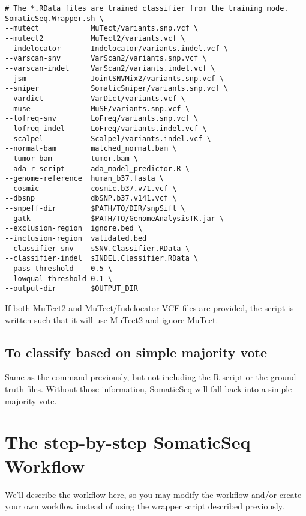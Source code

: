 \documentclass[10pt,letterpaper]{article}
\begin{document}
\begin{sloppypar}
\begin{lstlisting}
# The *.RData files are trained classifier from the training mode.
SomaticSeq.Wrapper.sh \
--mutect            MuTect/variants.snp.vcf \
--mutect2           MuTect2/variants.vcf \
--indelocator       Indelocator/variants.indel.vcf \
--varscan-snv       VarScan2/variants.snp.vcf \
--varscan-indel     VarScan2/variants.indel.vcf \
--jsm               JointSNVMix2/variants.snp.vcf \
--sniper            SomaticSniper/variants.snp.vcf \
--vardict           VarDict/variants.vcf \
--muse              MuSE/variants.snp.vcf \
--lofreq-snv        LoFreq/variants.snp.vcf \
--lofreq-indel      LoFreq/variants.indel.vcf \
--scalpel           Scalpel/variants.indel.vcf \
--normal-bam        matched_normal.bam \
--tumor-bam         tumor.bam \
--ada-r-script      ada_model_predictor.R \
--genome-reference  human_b37.fasta \
--cosmic            cosmic.b37.v71.vcf \
--dbsnp             dbSNP.b37.v141.vcf \
--snpeff-dir        $PATH/TO/DIR/snpSift \
--gatk              $PATH/TO/GenomeAnalysisTK.jar \
--exclusion-region  ignore.bed \
--inclusion-region  validated.bed
--classifier-snv    sSNV.Classifier.RData \
--classifier-indel  sINDEL.Classifier.RData \
--pass-threshold    0.5 \
--lowqual-threshold 0.1 \
--output-dir        $OUTPUT_DIR

\end{lstlisting}

If both MuTect2 and MuTect/Indelocator VCF files are provided, the script is written such that it will use MuTect2 and ignore MuTect.



\subsection{To classify based on simple majority vote}

Same as the command previously, but not including the R script or the ground truth files. Without those information, SomaticSeq will fall back into a simple majority vote.






\section{The step-by-step SomaticSeq Workflow}

We'll describe the workflow here, so you may modify the workflow and/or create your own workflow instead of using the wrapper script described previously. 



\end{sloppypar}
\end{document}
